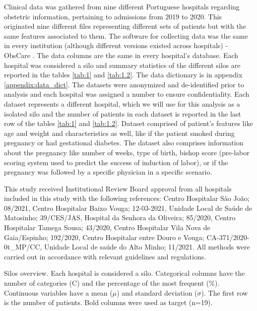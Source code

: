 
Clinical data was gathered from nine different Portuguese hospitals regarding obstetric information, pertaining to admissions from 2019 to 2020. This originated nine different files representing different sets of patients but with the same features associated to them. The software for collecting data was the same in every institution (although different versions existed across hospitals) - ObsCare \cite{obscare}. The data columns are the same in every hospital's database. Each hospital was considered a silo and summary statistics of the different silos are reported in the tables \ref{tab:1} and \ref{tab:1.2}. The data dictionary is in appendix \ref{appendix:data_dict}.
The datasets were anonymized and de-identified prior to analysis and each hospital was assigned a number to ensure confidentiality. Each dataset represents a different hospital, which we will use for this analysis as a isolated silo and the number of patients in each dataset is reported in the last row of the tables \ref{tab:1} and \ref{tab:1.2}. Dataset comprised of patient's features like age and weight and characteristics as well, like if the patient smoked during pregnancy or had gestational diabetes. The dataset also comprises information about the pregnancy like number of weeks, type of birth, bishop score (pre-labor scoring system used to predict the success of induction of labor), or if the pregnancy was followed by a specific physician in a specific scenario.

This study received Institutional Review Board approval from all hospitals included in this study with the following references: Centro Hospitalar São João; 08/2021, Centro Hospitalar Baixo Vouga; 12-03-2021, Unidade Local de Saúde de Matosinho; 39/CES/JAS, Hospital da Senhora da Oliveira; 85/2020, Centro Hospitalar Tamega Sousa; 43/2020, Centro Hospitalar Vila Nova de Gaia/Espinho; 192/2020, Centro Hospitalar entre Douro e Vouga; CA-371/2020-0t\_MP/CC, Unidade Local de saúde do Alto Minho; 11/2021.
All methods were carried out in accordance with relevant guidelines and regulations.

{\small
\begin{table}[h!]
\caption[Silos overview part 1]{\label{tab:1}Silos overview. Each hospital is considered a silo. Categorical columns have the number of categories (C) and the percentage of the most frequent (\%). Continuous variables have a mean ($\mu$) and standard deviation ($\sigma$).  The first row is the number of patients. Bold columns were used as target (n=19).}

\centering

\end{table}
}
\newpage

